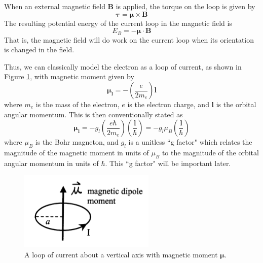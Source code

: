 \documentclass[twocolumn]{article}
\begin{document}
		When an external magnetic field $\mathbf{B}$ is applied, the torque on the loop is given by
		\begin{equation}
			\boldsymbol{\tau} = \boldsymbol{\mu} \times \mathbf{B}
		\end{equation}
		The resulting potential energy of the current loop in the magnetic field is
		\begin{equation} \label{eq:MagneticEnergy}
			E_{B} = -\boldsymbol{\mu}\cdot \mathbf{B}
		\end{equation}
		That is, the magnetic field will do work on the current loop when its orientation is changed in the field.
		
		Thus, we can classically model the electron as a loop of current, as shown in Figure \ref{fig:CurrentLoopDiagram}, with magnetic moment given by
		\begin{equation}
			\boldsymbol{\mu_l} = -\left(\frac{e}{2m_e}\right) \mathbf{l}
		\end{equation}
		where $m_e$ is the mass of the electron, $e$ is the electron charge, and $\mathbf{l}$ is the orbital angular momentum.
		This is then conventionally stated as
		\begin{equation} \label{eq:MagneticMoment}
			\boldsymbol{\mu_l} = -g_l \left( \frac{e\hbar}{2m_e} \right) \left(\frac{\mathbf{l}}{\hbar}\right) = -g_l\mu_B \left(\frac{\mathbf{l}}{\hbar}\right)
		\end{equation}
		where $\mu_B$ is the Bohr magneton, and $g_l$ is a unitless ``g factor" which relates the magnitude of the magnetic moment in units of $\mu_B$ to the magnitude of the orbital angular momentum in units of $\hbar$.
		This ``g factor" will be important later.
		
		\begin{figure}
			\centering
			\includegraphics[width=0.7\linewidth]{Images/CurrentLoopDiagram}
			\caption{A loop of current about a vertical axis with magnetic moment $\mathbf{\mu}$.\cite{stoltenberg_zeeman_2007}}
			\label{fig:CurrentLoopDiagram}
		\end{figure}
		
\end{document}
